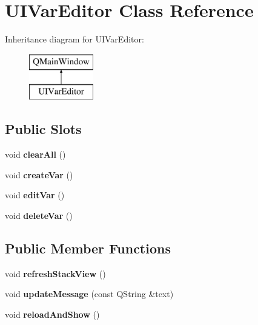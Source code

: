 \hypertarget{class_u_i_var_editor}{}\section{U\+I\+Var\+Editor Class Reference}
\label{class_u_i_var_editor}
Inheritance diagram for U\+I\+Var\+Editor\+:\begin{figure}[H]
\begin{center}
\leavevmode
\includegraphics[height=2.000000cm]{class_u_i_var_editor}
\end{center}
\end{figure}
\subsection*{Public Slots}
\begin{DoxyCompactItemize}
\item 
void {\bfseries clear\+All} ()\hypertarget{class_u_i_var_editor_a583adaf7df450217f8faebde1a4775c1}{}\label{class_u_i_var_editor_a583adaf7df450217f8faebde1a4775c1}

\item 
void {\bfseries create\+Var} ()\hypertarget{class_u_i_var_editor_a564a3e0000d1adb3ae603d293ae62075}{}\label{class_u_i_var_editor_a564a3e0000d1adb3ae603d293ae62075}

\item 
void {\bfseries edit\+Var} ()\hypertarget{class_u_i_var_editor_a9bbe9b0d0f0292374770692ce5dec985}{}\label{class_u_i_var_editor_a9bbe9b0d0f0292374770692ce5dec985}

\item 
void {\bfseries delete\+Var} ()\hypertarget{class_u_i_var_editor_a540139bbae9de50bb6f7506a4623958d}{}\label{class_u_i_var_editor_a540139bbae9de50bb6f7506a4623958d}

\end{DoxyCompactItemize}
\subsection*{Public Member Functions}
\begin{DoxyCompactItemize}
\item 
void {\bfseries refresh\+Stack\+View} ()\hypertarget{class_u_i_var_editor_a7273a7eb75b734b83154372ed654bd46}{}\label{class_u_i_var_editor_a7273a7eb75b734b83154372ed654bd46}

\item 
void {\bfseries update\+Message} (const Q\+String \&text)\hypertarget{class_u_i_var_editor_aba6da2be8860563975bd4113f9b0f512}{}\label{class_u_i_var_editor_aba6da2be8860563975bd4113f9b0f512}

\item 
void {\bfseries reload\+And\+Show} ()\hypertarget{class_u_i_var_editor_a079bb92e97caca1847c4a8242adc2b11}{}\label{class_u_i_var_editor_a079bb92e97caca1847c4a8242adc2b11}

\end{DoxyCompactItemize}
